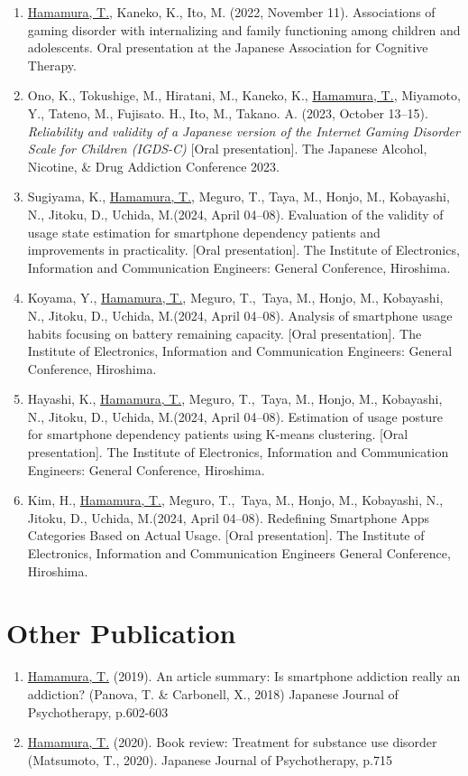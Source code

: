 \documentclass[a4paper]{article}
\begin{document}
\begin{enumerate}
	\item \underline{Hamamura, T.}, Kaneko, K., Ito, M. (2022, November 11). Associations of gaming disorder with internalizing and family functioning among children and adolescents. Oral presentation at the Japanese Association for Cognitive Therapy.
 	\item Ono, K., Tokushige, M., Hiratani, M., Kaneko, K., \underline{Hamamura, T.}, Miyamoto, Y., Tateno, M., Fujisato. H., Ito, M., Takano. A. (2023, October 13--15). \textit{Reliability and validity of a Japanese version of the Internet Gaming Disorder Scale for Children (IGDS-C)} [Oral presentation]. The Japanese Alcohol, Nicotine, \& Drug Addiction Conference 2023.
	\item Sugiyama, K., \underline{Hamamura, T.}, Meguro, T., Taya, M., Honjo, M., Kobayashi, N., Jitoku, D., Uchida, M.(2024, April 04--08). Evaluation of the validity of usage state estimation for smartphone dependency patients and improvements in practicality. [Oral presentation]. The Institute of Electronics, Information and Communication Engineers: General Conference, Hiroshima.
	\item Koyama, Y., \underline{Hamamura, T.}, Meguro, T.,\ Taya, M., Honjo, M., Kobayashi, N., Jitoku, D., Uchida, M.(2024, April 04--08). Analysis of smartphone usage habits focusing on battery remaining capacity. [Oral presentation]. The Institute of Electronics, Information and Communication Engineers: General Conference, Hiroshima.
	\item Hayashi, K., \underline{Hamamura, T.}, Meguro, T.,\ Taya, M., Honjo, M., Kobayashi, N., Jitoku, D., Uchida, M.(2024, April 04--08). Estimation of usage posture for smartphone dependency patients using K-means clustering. [Oral presentation]. The Institute of Electronics, Information and Communication Engineers: General Conference, Hiroshima.
	\item Kim, H., \underline{Hamamura, T.}, Meguro, T.,\ Taya, M., Honjo, M., Kobayashi, N., Jitoku, D., Uchida, M.(2024, April 04--08). Redefining Smartphone Apps Categories Based on Actual Usage. [Oral presentation]. The Institute of Electronics, Information and Communication Engineers General Conference, Hiroshima.
\end{enumerate}

\section{Other Publication}
	\begin{enumerate}
		\item \underline{Hamamura, T.} (2019). An article summary: Is smartphone addiction really an addiction? (Panova, T. \& Carbonell, X., 2018) Japanese Journal of Psychotherapy, p.602-603
		\item \underline{Hamamura, T.} (2020). Book review: Treatment for substance use disorder (Matsumoto, T., 2020). Japanese Journal of Psychotherapy, p.715
	\end{enumerate}
\end{document}
